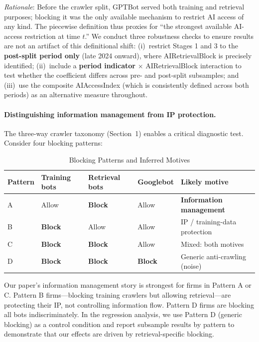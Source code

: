 \documentclass[12pt,a4paper]{article}
\begin{document}
\noindent \textit{Rationale}: Before the crawler split, GPTBot served both training and retrieval purposes; blocking it was the only available mechanism to restrict AI access of any kind. The piecewise definition thus proxies for ``the strongest available AI-access restriction at time $t$.'' We conduct three robustness checks to ensure results are not an artifact of this definitional shift: (i)~restrict Stages 1 and 3 to the \textbf{post-split period only} (late 2024 onward), where AIRetrievalBlock is precisely identified; (ii)~include a \textbf{period indicator} $\times$ AIRetrievalBlock interaction to test whether the coefficient differs across pre- and post-split subsamples; and (iii)~use the composite AIAccessIndex (which is consistently defined across both periods) as an alternative measure throughout.

\paragraph{Distinguishing information management from IP protection.} The three-way crawler taxonomy (Section~1) enables a critical diagnostic test. Consider four blocking patterns:

\begin{table}[htbp]
\centering
\small
\caption{Blocking Patterns and Inferred Motives}
\label{tab:blocking_patterns}
\begin{tabularx}{\textwidth}{p{1.2cm}p{2.5cm}p{2.5cm}p{2.5cm}X}
\toprule
Pattern & Training bots & Retrieval bots & Googlebot & Likely motive \\
\midrule
A & Allow & \textbf{Block} & Allow & \textbf{Information management} \\
B & \textbf{Block} & Allow & Allow & IP / training-data protection \\
C & \textbf{Block} & \textbf{Block} & Allow & Mixed: both motives \\
D & \textbf{Block} & \textbf{Block} & \textbf{Block} & Generic anti-crawling (noise) \\
\bottomrule
\end{tabularx}
\end{table}

\noindent Our paper's information management story is strongest for firms in Pattern A or C. Pattern B firms---blocking training crawlers but allowing retrieval---are protecting their IP, not controlling information flow. Pattern D firms are blocking all bots indiscriminately. In the regression analysis, we use Pattern D (generic blocking) as a control condition and report subsample results by pattern to demonstrate that our effects are driven by retrieval-specific blocking.
\end{document}
